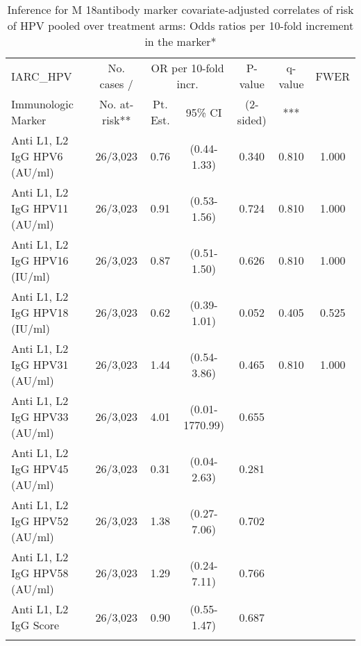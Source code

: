 \begin{longtable}{lcccccc}
\caption{Inference for M 18antibody marker covariate-adjusted correlates of risk of HPV pooled over treatment arms: Odds ratios per 10-fold increment in the marker*} \\ 
   \hline
 
         \multicolumn{1}{l}{IARC_HPV} & \multicolumn{1}{c}{No. cases /}   & \multicolumn{2}{c}{OR per 10-fold incr.}                     & \multicolumn{1}{c}{P-value}   & \multicolumn{1}{c}{q-value}   & \multicolumn{1}{c}{FWER} \\ 
         \multicolumn{1}{l}{Immunologic Marker}            & \multicolumn{1}{c}{No. at-risk**} & \multicolumn{1}{c}{Pt. Est.} & \multicolumn{1}{c}{95\% CI} & \multicolumn{1}{c}{(2-sided)} & \multicolumn{1}{c}{***} & \multicolumn{1}{c}{} \\ 
         \hline
 
    Anti L1, L2 IgG HPV6 (AU/ml) & 26/3,023 & 0.76 & (0.44-1.33) & 0.340 & 0.810 & 1.000 \\ 
  Anti L1, L2 IgG HPV11 (AU/ml) & 26/3,023 & 0.91 & (0.53-1.56) & 0.724 & 0.810 & 1.000 \\ 
  Anti L1, L2 IgG HPV16 (IU/ml) & 26/3,023 & 0.87 & (0.51-1.50) & 0.626 & 0.810 & 1.000 \\ 
  Anti L1, L2 IgG HPV18 (IU/ml) & 26/3,023 & 0.62 & (0.39-1.01) & 0.052 & 0.405 & 0.525 \\ 
  Anti L1, L2 IgG HPV31 (AU/ml) & 26/3,023 & 1.44 & (0.54-3.86) & 0.465 & 0.810 & 1.000 \\ 
  Anti L1, L2 IgG HPV33 (AU/ml) & 26/3,023 & 4.01 & (0.01-1770.99) & 0.655 &     &     \\ 
  Anti L1, L2 IgG HPV45 (AU/ml) & 26/3,023 & 0.31 & (0.04-2.63) & 0.281 &     &     \\ 
  Anti L1, L2 IgG HPV52 (AU/ml) & 26/3,023 & 1.38 & (0.27-7.06) & 0.702 &     &     \\ 
  Anti L1, L2 IgG HPV58 (AU/ml) & 26/3,023 & 1.29 & (0.24-7.11) & 0.766 &     &     \\ 
  Anti L1, L2 IgG Score & 26/3,023 & 0.90 & (0.55-1.47) & 0.687 &     &     \\ 
   \hline
\hline
\label{tab:CoR_univariable_logistic_pretty}
\end{longtable}
